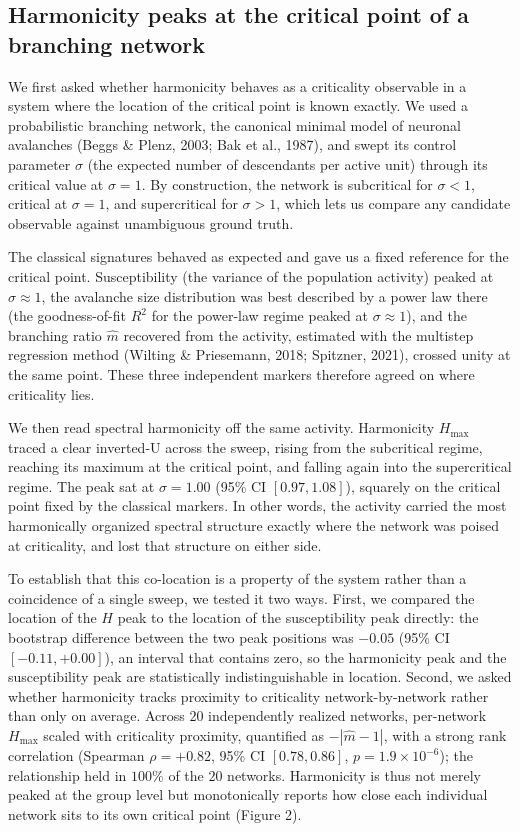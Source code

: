 \documentclass[11pt]{article}
\begin{document}
\subsection{Harmonicity peaks at the critical point of a branching network}
We first asked whether harmonicity behaves as a criticality observable in a system where the location of the critical point is known exactly. We used a probabilistic branching network, the canonical minimal model of neuronal avalanches (Beggs \& Plenz, 2003; Bak et al., 1987), and swept its control parameter $\sigma$ (the expected number of descendants per active unit) through its critical value at $\sigma=1$. By construction, the network is subcritical for $\sigma<1$, critical at $\sigma=1$, and supercritical for $\sigma>1$, which lets us compare any candidate observable against unambiguous ground truth.

The classical signatures behaved as expected and gave us a fixed reference for the critical point. Susceptibility (the variance of the population activity) peaked at $\sigma\approx1$, the avalanche size distribution was best described by a power law there (the goodness-of-fit $R^2$ for the power-law regime peaked at $\sigma\approx1$), and the branching ratio $\hat m$ recovered from the activity, estimated with the multistep regression method (Wilting \& Priesemann, 2018; Spitzner, 2021), crossed unity at the same point. These three independent markers therefore agreed on where criticality lies.

We then read spectral harmonicity off the same activity. Harmonicity $H_{\max}$ traced a clear inverted-U across the sweep, rising from the subcritical regime, reaching its maximum at the critical point, and falling again into the supercritical regime. The peak sat at $\sigma=1.00$ (95\% CI $[0.97,1.08]$), squarely on the critical point fixed by the classical markers. In other words, the activity carried the most harmonically organized spectral structure exactly where the network was poised at criticality, and lost that structure on either side.

To establish that this co-location is a property of the system rather than a coincidence of a single sweep, we tested it two ways. First, we compared the location of the $H$ peak to the location of the susceptibility peak directly: the bootstrap difference between the two peak positions was $-0.05$ (95\% CI $[-0.11,+0.00]$), an interval that contains zero, so the harmonicity peak and the susceptibility peak are statistically indistinguishable in location. Second, we asked whether harmonicity tracks proximity to criticality network-by-network rather than only on average. Across $20$ independently realized networks, per-network $H_{\max}$ scaled with criticality proximity, quantified as $-|\hat m-1|$, with a strong rank correlation (Spearman $\rho=+0.82$, 95\% CI $[0.78,0.86]$, $p=1.9\times10^{-6}$); the relationship held in $100\%$ of the $20$ networks. Harmonicity is thus not merely peaked at the group level but monotonically reports how close each individual network sits to its own critical point (Figure 2).
\end{document}
